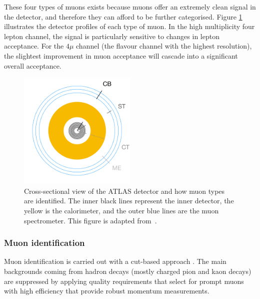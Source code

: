 These four types of muons exists because muons offer an extremely clean signal in the detector, and therefore they can afford to be further categorised. Figure \ref{fig:typesofmuons} illustrates the detector profiles of each type of muon. In the high multiplicity four lepton channel, the signal is particularly sensitive to changes in lepton acceptance. For the $4\mu$ channel (the flavour channel with the highest resolution), the slightest improvement in muon acceptance will cascade into a significant overall acceptance. 
\begin{figure}
    \centering
    \includegraphics[width=0.5\textwidth]{Figures/LHC/muon_types.pdf}
    \caption{Cross-sectional view of the ATLAS detector and how muon types are identified. The inner black lines represent the inner detector, the yellow is the calorimeter, and the outer blue lines are the muon spectrometer. This figure is adapted from~\cite{Ottersbach:2012mma}.}
    \label{fig:typesofmuons}
\end{figure}
\subsubsection{Muon identification}

Muon identification is carried out with a cut-based approach \cite{ATLAS_muon_reco_2010}. The main backgrounds coming from hadron decays (mostly charged pion and kaon decays) are suppressed by applying quality requirements that select for prompt muons with high efficiency that provide robust momentum measurements. 

